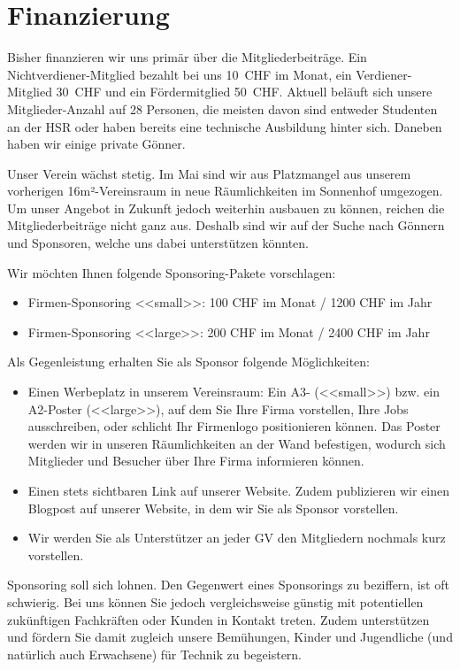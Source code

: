 \documentclass[10pt,a4paper,parskip,fleqn]{scrartcl}
\newcommand{\membercount}{28}
\begin{document}
\section{Finanzierung}

Bisher finanzieren wir uns primär über die Mitgliederbeiträge. Ein
Nichtverdiener-Mitglied bezahlt bei uns 10~CHF im Monat, ein Verdiener-Mitglied
30~CHF und ein Fördermitglied 50~CHF. Aktuell beläuft sich unsere
Mitglieder-Anzahl auf \membercount{} Personen, die meisten davon sind entweder
Studenten an der HSR oder haben bereits eine technische Ausbildung hinter sich.
Daneben haben wir einige private Gönner.

Unser Verein wächst stetig. Im Mai sind wir aus Platzmangel aus unserem
vorherigen 16m²-Vereinsraum in neue Räumlichkeiten im Sonnenhof umgezogen. Um
unser Angebot in Zukunft jedoch weiterhin ausbauen zu können, reichen die
Mitgliederbeiträge nicht ganz aus. Deshalb sind wir auf der Suche nach Gönnern
und Sponsoren, welche uns dabei unterstützen könnten.

Wir möchten Ihnen folgende Sponsoring-Pakete vorschlagen:

\begin{itemize}
	\item Firmen-Sponsoring <<small>>: 100 CHF im Monat / 1200 CHF im Jahr	
	\item Firmen-Sponsoring <<large>>: 200 CHF im Monat / 2400 CHF im Jahr	
\end{itemize}

Als Gegenleistung erhalten Sie als Sponsor folgende Möglichkeiten:

\begin{itemize}
	\item Einen Werbeplatz in unserem Vereinsraum: Ein A3- (<<small>>) bzw.
		ein A2-Poster (<<large>>), auf dem Sie Ihre Firma vorstellen, Ihre Jobs
		ausschreiben, oder schlicht Ihr Firmenlogo positionieren können. Das Poster
		werden wir in unseren Räumlichkeiten an der Wand befestigen, wodurch sich
		Mitglieder und Besucher über Ihre Firma informieren können.
	\item Einen stets sichtbaren Link auf unserer Website. Zudem publizieren wir
		einen Blogpost auf unserer Website, in dem wir Sie als Sponsor vorstellen.
	\item Wir werden Sie als Unterstützer an jeder GV den Mitgliedern nochmals
		kurz vorstellen.
\end{itemize}

Sponsoring soll sich lohnen. Den Gegenwert eines Sponsorings zu beziffern, ist
oft schwierig. Bei uns können Sie jedoch vergleichsweise günstig mit
potentiellen zukünftigen Fachkräften oder Kunden in Kontakt treten. Zudem
unterstützen und fördern Sie damit zugleich unsere Bemühungen, Kinder und
Jugendliche (und natürlich auch Erwachsene) für Technik zu begeistern.
\end{document}
